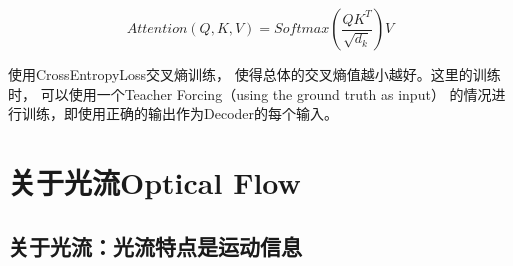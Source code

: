 \documentclass[AutoFakeBold]{MyFormat}
\begin{document}
\begin{equation}
    Attention(Q, K, V)=Softmax(\frac{QK^T}{\sqrt{d_k}})V
\end{equation}

\par 使用CrossEntropyLoss交叉熵训练，
使得总体的交叉熵值越小越好。这里的训练时，
可以使用一个Teacher Forcing（using the ground truth as input）
的情况进行训练，即使用正确的输出作为Decoder的每个输入。


\chapter{关于光流Optical Flow}

\section{关于光流：光流特点是运动信息}
\end{document}
